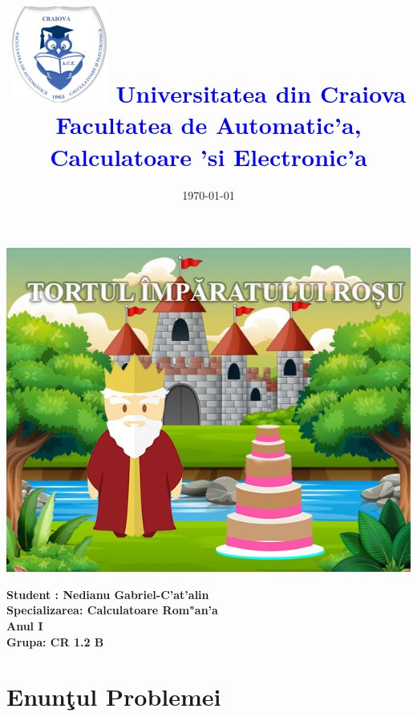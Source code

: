\documentclass{article}
\begin{document}
\title{\textbf{\includegraphics[scale=0.5]{Sigla_Ucv.png}
\textcolor{blue}{Universitatea din Craiova \\Facultatea de Automatic'a, Calculatoare 'si Electronic'a}}}
\date{\today}

\maketitle

\begin{center}
\includegraphics[scale=0.72]{Tortul_Regelui}
\end{center}
\textbf{Student : Nedianu Gabriel-C'at'alin} \\
\textbf{Specializarea: Calculatoare Rom"an'a\\ Anul I\\ Grupa: CR 1.2 B}

\newpage

\tableofcontents

\newpage

\newpage

\section{Enun\c{t}ul Problemei}
\end{document}
